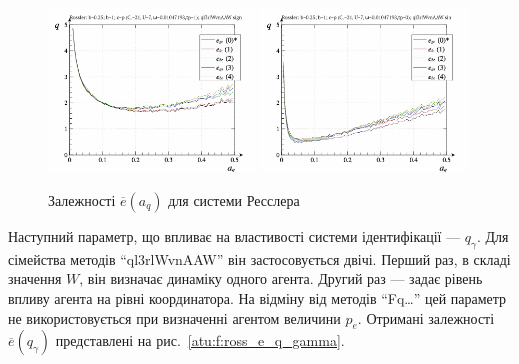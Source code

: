 \begin{figure}[ht!]
\begin{center}
  \includegraphics[width=0.49\textwidth]{p/cha/ross/ross_id-p_a_q_ql3rlWvnAAW_sign.png}
  \hfill
  \includegraphics[width=0.49\textwidth]{p/cha/ross/ross_id-p_a_q_ql3rlWvnAAW_sin.png}
\end{center}
\caption{Залежності $ \overline{e} (a_q) $ для системи Ресслера}
\label{atu:f:ross_e_a_q}
\end{figure}

Наступний параметр, що впливає на властивості системи
ідентифікації ---
$ q_\gamma $. Для сімейства методів ``ql3rlWvnAAW'' він застосовується
двічі. Перший раз, в складі значення
$W$, він визначає динаміку одного агента. Другий раз --- задає
рівень впливу агента на рівні координатора. На відміну від
методів ``Fq\ldots'' цей параметр не використовується при визначенні агентом
величини $p_e$. Отримані залежності
$ \overline{e}(q_\gamma) $ представлені на рис.~\ref{atu:f:ross_e_q_gamma}.

